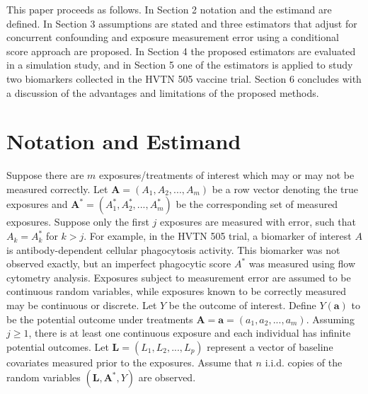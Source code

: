 \documentclass[useAMS,usenatbib,referee]{biom}
\begin{document}
This paper proceeds as follows. In Section 2 notation and the estimand are defined. In Section 3 assumptions are stated and three estimators that adjust for concurrent confounding and exposure measurement error using a conditional score approach are proposed. In Section 4 the proposed estimators are evaluated in a simulation study, and in Section 5 one of the estimators is applied to study two biomarkers collected in the HVTN 505 vaccine trial. Section 6 concludes with a discussion of the advantages and limitations of the proposed methods.

\section{Notation and Estimand}
\label{s:notation}

Suppose there are $m$ exposures/treatments of interest which may or may not be measured correctly. Let $\bm{A} = (A_{1}, A_{2}, ..., A_{m})$ be a row vector denoting the true exposures and $\bm{A}^{*} =  (A^{*}_{1}, A^{*}_{2}, ..., A^{*}_{m})$ be the corresponding set of measured exposures. Suppose only the first $j$ exposures are measured with error, such that $A_{k} = A^{*}_{k}$ for $k > j$. For example, in the HVTN 505 trial, a biomarker of interest $A$ is antibody-dependent cellular phagocytosis activity. This biomarker was not observed exactly, but an imperfect phagocytic score $A^{*}$ was measured using flow cytometry analysis. Exposures subject to measurement error are assumed to be continuous random variables, while exposures known to be correctly measured may be continuous or discrete. Let $Y$ be the outcome of interest. Define $Y(\bm{a})$ to be the potential outcome under treatments $\bm{A} = \bm{a} = (a_{1}, a_{2}, ..., a_{m})$. Assuming $j \geq 1$, there is at least one continuous exposure and each individual has infinite potential outcomes. Let $\bm{L} =  (L_{1}, L_{2}, ..., L_{p})$ represent a vector of baseline covariates measured prior to the exposures. Assume that $n$ i.i.d. copies of the random variables $(\bm{L}, \bm{A}^{*}, Y)$ are observed.
\end{document}
